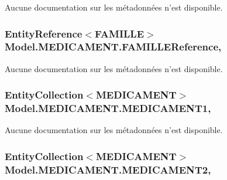 Aucune documentation sur les métadonnées n'est disponible. 

\hypertarget{class_model_1_1_m_e_d_i_c_a_m_e_n_t_a9b87fe7d7a3f5819c14257b5b3fb2cb5}{
\subsubsection[{F\-A\-M\-I\-L\-L\-E\-Reference}]{\setlength{\rightskip}{0pt plus 5cm}Entity\-Reference$<${\bf F\-A\-M\-I\-L\-L\-E}$>$ Model.\-M\-E\-D\-I\-C\-A\-M\-E\-N\-T.\-F\-A\-M\-I\-L\-L\-E\-Reference\hspace{0.3cm}{\ttfamily [get]}, {\ttfamily [set]}}}\label{class_model_1_1_m_e_d_i_c_a_m_e_n_t_a9b87fe7d7a3f5819c14257b5b3fb2cb5}


Aucune documentation sur les métadonnées n'est disponible. 

\hypertarget{class_model_1_1_m_e_d_i_c_a_m_e_n_t_a1aa6c5c5d0fb3c9ff49ea59b184b71f7}{
\subsubsection[{M\-E\-D\-I\-C\-A\-M\-E\-N\-T1}]{\setlength{\rightskip}{0pt plus 5cm}Entity\-Collection$<${\bf M\-E\-D\-I\-C\-A\-M\-E\-N\-T}$>$ Model.\-M\-E\-D\-I\-C\-A\-M\-E\-N\-T.\-M\-E\-D\-I\-C\-A\-M\-E\-N\-T1\hspace{0.3cm}{\ttfamily [get]}, {\ttfamily [set]}}}\label{class_model_1_1_m_e_d_i_c_a_m_e_n_t_a1aa6c5c5d0fb3c9ff49ea59b184b71f7}


Aucune documentation sur les métadonnées n'est disponible. 

\hypertarget{class_model_1_1_m_e_d_i_c_a_m_e_n_t_ab27f3343d5bdd58cfb9a866c3163fec3}{
\subsubsection[{M\-E\-D\-I\-C\-A\-M\-E\-N\-T2}]{\setlength{\rightskip}{0pt plus 5cm}Entity\-Collection$<${\bf M\-E\-D\-I\-C\-A\-M\-E\-N\-T}$>$ Model.\-M\-E\-D\-I\-C\-A\-M\-E\-N\-T.\-M\-E\-D\-I\-C\-A\-M\-E\-N\-T2\hspace{0.3cm}{\ttfamily [get]}, {\ttfamily [set]}}}\label{class_model_1_1_m_e_d_i_c_a_m_e_n_t_ab27f3343d5bdd58cfb9a866c3163fec3}


